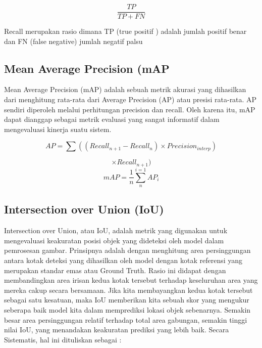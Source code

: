 \begin{equation}
    \frac{TP}{TP+FN}
\end{equation}

Recall merupakan rasio dimana TP (true positif ) adalah jumlah positif benar dan FN (false negative) jumlah negatif palsu

\subsection*{Mean Average Precision (mAP}
Mean Average Precision (mAP) adalah sebuah metrik akurasi yang dihasilkan dari menghitung rata-rata dari Average Precision (AP) atau presisi rata-rata. AP sendiri diperoleh melalui perhitungan precision dan recall. Oleh karena itu, mAP dapat dianggap sebagai metrik evaluasi yang sangat informatif dalam mengevaluasi kinerja suatu sistem.

\begin{equation}
    AP=\sum ((Recall_{n+1}-Recall_{n})\times Precision_{interp})
\end{equation}

\begin{equation}
  \times Recall_{n+1})
\end{equation}
\begin{equation}
    mAP=\frac{1}{n}\sum_{n}^{i=1}AP_{i}
\end{equation}

\subsection{Intersection over Union (IoU)}
\label{subsec:hukumnewton}

Intersection over Union, atau IoU, adalah metrik yang digunakan untuk mengevaluasi keakuratan posisi objek yang dideteksi oleh model dalam pemrosesan gambar. Prinsipnya adalah dengan menghitung area persinggungan antara kotak deteksi yang dihasilkan oleh model dengan kotak referensi yang merupakan standar emas atau Ground Truth. Rasio ini didapat dengan membandingkan area irisan kedua kotak tersebut terhadap keseluruhan area yang mereka cakup secara bersamaan. Jika kita membayangkan kedua kotak tersebut sebagai satu kesatuan, maka IoU memberikan kita sebuah skor yang mengukur seberapa baik model kita dalam memprediksi lokasi objek sebenarnya. Semakin besar area persinggungan relatif terhadap total area gabungan, semakin tinggi nilai IoU, yang menandakan keakuratan prediksi yang lebih baik. Secara Sistematis, hal ini dituliskan sebagai :

